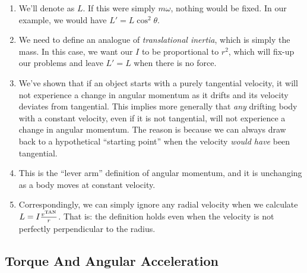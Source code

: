 \begin{enumerate}
  \item We'll denote  as $L$. If this were
  simply $m\omega$, nothing would be fixed. In our example, we would
  have $L' = L \cos^2 \theta$.

  \item We need to define an analogue of \emph{translational inertia},
  which is simply the mass. In this case, we want our  $I$ to be proportional to $r^2$, which will fix-up our
  problems and leave $L' = L$ when there is no force.

  \item We've shown that if an object starts with a purely tangential
  velocity, it will not experience a change in angular momentum as it
  drifts and its velocity deviates from tangential. This implies more
  generally that \emph{any} drifting body with a constant velocity, even
  if it is not tangential, will not experience a change in angular
  momentum. The reason is because we can always draw back to a
  hypothetical ``starting point'' when the velocity \emph{would have}
  been tangential.

  \item This is the ``lever arm'' definition of angular momentum, and it
  is unchanging as a body moves at constant velocity.

  \item Correspondingly, we can simply ignore any radial velocity when
  we calculate $L = I \frac{v^{\text{TAN}}}{r}$. That is: the definition holds
  even when the velocity is not perfectly perpendicular to the radius.
\end{enumerate}

\subsection{Torque And Angular Acceleration}

